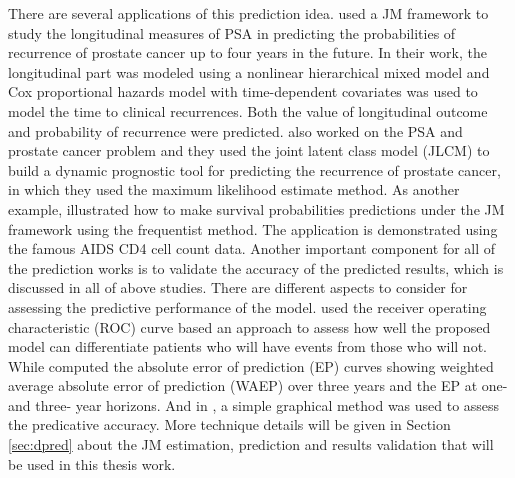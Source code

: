 There are several applications of this prediction idea. \cite{yu2008individual} used a JM framework to study the longitudinal measures of PSA in predicting the probabilities of recurrence of prostate cancer up to four years in the future. In their work, the longitudinal part was modeled using a nonlinear hierarchical mixed model and Cox proportional hazards model with time-dependent covariates was used to model the time to clinical recurrences. Both the value of longitudinal outcome and probability of recurrence were predicted. \cite{proust2009development} also worked on the PSA and prostate cancer problem and they used the joint latent class model (JLCM) \citep{lin2002latent} to build a dynamic prognostic tool for predicting the recurrence of prostate cancer, in which they used the maximum likelihood estimate method. As another example, \cite{rizopoulos2011dynamic} illustrated how to make survival probabilities predictions under the JM framework using the frequentist method. The application is demonstrated using the famous AIDS CD4 cell count data. Another important component for all of the prediction works is to validate the accuracy of the predicted results, which is discussed in all of above studies. There are different aspects to consider for assessing the predictive performance of the model. \cite{rizopoulos2011dynamic} used the receiver operating characteristic (ROC) curve based an approach to assess how well the proposed model can differentiate patients who will have events from those who will not. While \cite{proust2009development} computed the absolute error of prediction (EP) curves showing weighted average absolute error of prediction (WAEP) over three years and the EP at one- and three- year horizons. And in \cite{taylor2013real}, a simple graphical method was used to assess the predicative accuracy. More technique details will be given in Section \ref{sec:dpred} about the JM estimation, prediction and results validation that will be used in this thesis work.



